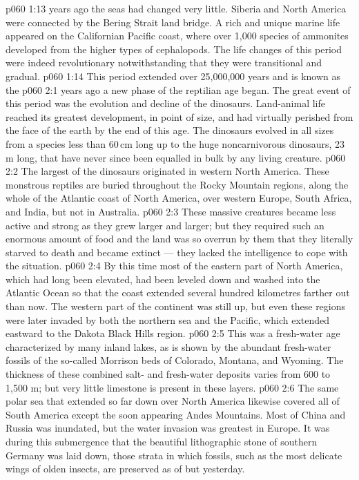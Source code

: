 \vs p060 1:13 \pc {} years ago the seas had changed very little. Siberia and North America were connected by the Bering Strait land bridge. A rich and unique marine life appeared on the Californian Pacific coast, where over 1,000 species of ammonites developed from the higher types of cephalopods. The life changes of this period were indeed revolutionary notwithstanding that they were transitional and gradual.
\vs p060 1:14 \pc This period extended over 25,000,000 years and is known as the 
\vs p060 2:1  years ago a new phase of the reptilian age began. The great event of this period was the evolution and decline of the dinosaurs. Land\hyp{}animal life reached its greatest development, in point of size, and had virtually perished from the face of the earth by the end of this age. The dinosaurs evolved in all sizes from a species less than 60\,cm long up to the huge noncarnivorous dinosaurs, 23\,m long, that have never since been equalled in bulk by any living creature.
\vs p060 2:2 The largest of the dinosaurs originated in western North America. These monstrous reptiles are buried throughout the Rocky Mountain regions, along the whole of the Atlantic coast of North America, over western Europe, South Africa, and India, but not in Australia.
\vs p060 2:3 These massive creatures became less active and strong as they grew larger and larger; but they required such an enormous amount of food and the land was so overrun by them that they literally starved to death and became extinct --- they lacked the intelligence to cope with the situation.
\vs p060 2:4 By this time most of the eastern part of North America, which had long been elevated, had been leveled down and washed into the Atlantic Ocean so that the coast extended several hundred kilometres farther out than now. The western part of the continent was still up, but even these regions were later invaded by both the northern sea and the Pacific, which extended eastward to the Dakota Black Hills region.
\vs p060 2:5 This was a fresh\hyp{}water age characterized by many inland lakes, as is shown by the abundant fresh\hyp{}water fossils of the so\hyp{}called Morrison beds of Colorado, Montana, and Wyoming. The thickness of these combined salt\hyp{} and fresh\hyp{}water deposits varies from 600 to 1,500 m; but very little limestone is present in these layers.
\vs p060 2:6 The same polar sea that extended so far down over North America likewise covered all of South America except the soon appearing Andes Mountains. Most of China and Russia was inundated, but the water invasion was greatest in Europe. It was during this submergence that the beautiful lithographic stone of southern Germany was laid down, those strata in which fossils, such as the most delicate wings of olden insects, are preserved as of but yesterday.
